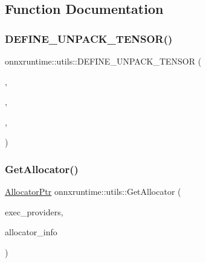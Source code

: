 \subsection{Function Documentation}
\mbox{\label{namespaceonnxruntime_1_1utils_ad84e1a43162347e3dc2540869adfc10b}} 
\subsubsection{\texorpdfstring{D\+E\+F\+I\+N\+E\+\_\+\+U\+N\+P\+A\+C\+K\+\_\+\+T\+E\+N\+S\+O\+R()}{DEFINE\_UNPACK\_TENSOR()}}
{\footnotesize\ttfamily onnxruntime\+::utils\+::\+D\+E\+F\+I\+N\+E\+\_\+\+U\+N\+P\+A\+C\+K\+\_\+\+T\+E\+N\+S\+OR (\begin{DoxyParamCaption}\item[{double}]{,  }\item[{O\+N\+N\+X\+\_\+\+N\+A\+M\+E\+S\+P\+A\+C\+E\+::\+Tensor\+Proto\+\_\+\+Data\+Type\+\_\+\+D\+O\+U\+B\+LE}]{,  }\item[{double\+\_\+data}]{,  }\item[{double\+\_\+data\+\_\+size}]{ }\end{DoxyParamCaption})}

\mbox{\label{namespaceonnxruntime_1_1utils_a06318e643d42f85829d91db93306ea68}} 
\subsubsection{\texorpdfstring{Get\+Allocator()}{GetAllocator()}\hspace{0.1cm}{\footnotesize\ttfamily [1/2]}}
{\footnotesize\ttfamily \mbox{\hyperlink{namespaceonnxruntime_a6cdac724c5dcefded3a63f08dae58fda}{Allocator\+Ptr}} onnxruntime\+::utils\+::\+Get\+Allocator (\begin{DoxyParamCaption}\item[{const \mbox{\hyperlink{classonnxruntime_1_1ExecutionProviders}{Execution\+Providers}} \&}]{exec\+\_\+providers,  }\item[{const \mbox{\hyperlink{structONNXRuntimeAllocatorInfo}{O\+N\+N\+X\+Runtime\+Allocator\+Info}} \&}]{allocator\+\_\+info }\end{DoxyParamCaption})}

